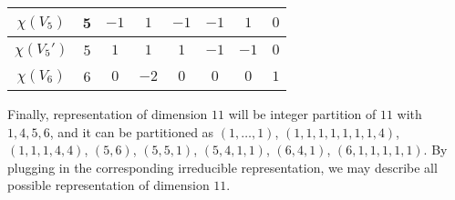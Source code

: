 \documentclass[12pt]{article}
\begin{document}
\begin{center}
\begin{tabular}{||c c c c c c c c||}
\hline
$\chi(V_5)$ & 5 & $-1$ & $1$ & $-1$ & $-1$ & $1$ & $0$ \\
\hline
$\chi(V_5')$ & 5 & $1$ & $1$ & $1$ & $-1$ & $-1$ & $0$ \\
\hline
$\chi(V_6)$ & 6 & $0$ & $-2$ & $0$ & $0$ & $0$ & $1$ \\
\hline
\end{tabular}
\end{center}
Finally, representation of dimension $11$ will be integer partition of $11$ with $1, 4, 5, 6$, and it can be partitioned as $(1, \dots, 1)$, $(1, 1, 1, 1, 1, 1, 1, 4)$, $(1, 1, 1, 4, 4)$, $(5, 6)$, $(5, 5, 1)$, $(5, 4, 1, 1)$, $(6, 4, 1)$, $(6, 1, 1, 1, 1, 1)$. By plugging in the corresponding irreducible representation, we may describe all possible representation of dimension $11$.
\end{document}

